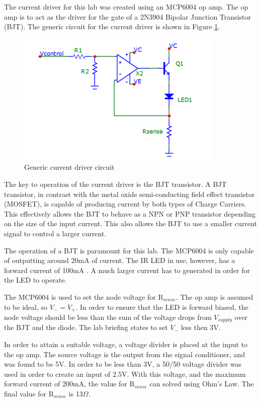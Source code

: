 
The current driver for this lab was created using an MCP6004 op amp. The op amp is to act as the driver for the gate of a 2N3904 Bipolar Junction Transistor (BJT). The generic circuit for the current driver is shown in Figure \ref{fig:currentgeneric}. 
	
	\begin{figure}[H]
		\centering
		\includegraphics[width=.6\textwidth]{CircuitDevelopment/ledgeneric.png}
		\caption{Generic current driver circuit \cite{b2}}
		\label{fig:currentgeneric}
	\end{figure}

The key to operation of the current driver is the BJT transistor. A BJT transistor, in contrast with the metal oxide semi-conducting field effect transistor (MOSFET), is capable of producing current by both types of Charge Carriers. This effectively allows the BJT to behave as a NPN or PNP transistor depending on the size of the input current. This also allows the BJT to use a smaller current signal to control a larger current. 

The operation of a BJT is paramount for this lab. The MCP6004 is only capable of outputting around 20mA of current. The IR LED in use, however, has a forward current of 100mA \cite{LEDDATA}. A much larger current has to generated in order for the LED to operate. 

The MCP6004 is used to set the node voltage for R$_{sense}$. The op amp is assumed to be ideal, so $V_- = V_+$. In order to ensure that the LED is forward biased, the node voltage should be less than the sum of the voltage drops from $V_{supply}$ over the BJT and the diode. The lab briefing \cite{b2} states to set $V_-$ less then 3V.

In order to attain a suitable voltage, a voltage divider is placed at the input to the op amp. The source voltage is the output from the signal conditioner, and was found to be 5V. In order to be less than 3V, a 50/50 voltage divider was used in order to create an input of 2.5V. With this voltage, and the maximum forward current of 200mA, the value for R$_{sense}$ can solved using Ohm's Law. The final value for R$_{sense}$ is 13$\Omega$.

